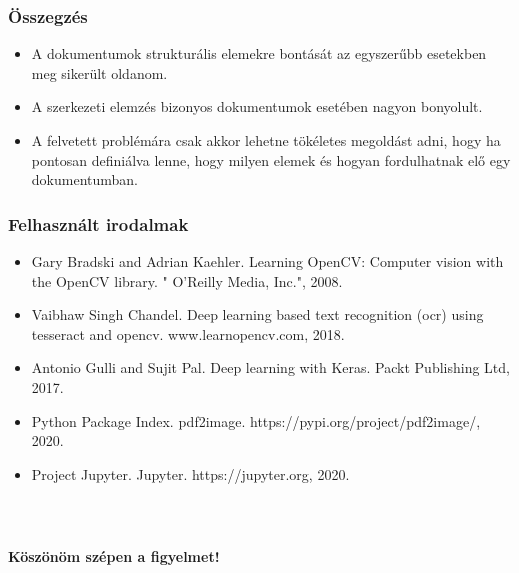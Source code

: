 \documentclass{beamer}
\begin{document}
\begin{frame}[fragile]
\frametitle{Összegzés}

\begin{itemize}
	\item A dokumentumok strukturális elemekre bontását az egyszerűbb esetekben meg sikerült oldanom.
    \item A szerkezeti elemzés bizonyos dokumentumok esetében nagyon bonyolult.
    \item A felvetett problémára csak akkor lehetne tökéletes megoldást adni, hogy ha pontosan definiálva lenne, hogy milyen elemek és hogyan fordulhatnak elő egy dokumentumban.
\end{itemize}

\end{frame}

\begin{frame}[fragile]
\frametitle{Felhasznált irodalmak}

\begin{itemize}
    \item Gary Bradski and Adrian Kaehler. Learning OpenCV: Computer vision with the OpenCV library. " O’Reilly Media, Inc.", 2008.
    \item Vaibhaw Singh Chandel. Deep learning based text recognition (ocr) using tesseract and opencv. www.learnopencv.com, 2018.
    \item Antonio Gulli and Sujit Pal. Deep learning with Keras. Packt Publishing Ltd, 2017.
    \item Python Package Index. pdf2image. https://pypi.org/project/pdf2image/, 2020.
    \item Project Jupyter. Jupyter. https://jupyter.org, 2020.
\end{itemize}


\end{frame}

\begin{frame}[fragile]
\frametitle{\ }

\begin{center}

    \Large

    \textbf{Köszönöm szépen a figyelmet!}

    \bigskip

\end{center}

\end{frame}
\end{document}
